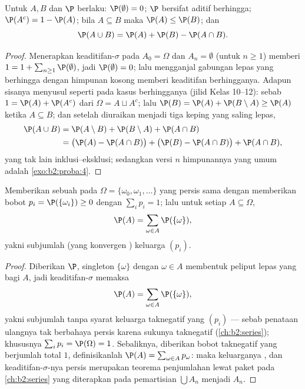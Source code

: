 \begin{proposition}\label{prop:b2:proba:rules}
Untuk  $A, B$ dan  $\P$ berlaku:
$\P(\emptyset) = 0$; $\P$ bersifat aditif berhingga; $\P(A^c) = 1 -
\P(A)$; bila $A \subseteq B$ maka $\P(A) \leq \P(B)$; dan
\[
\P(A \cup B) = \P(A) + \P(B) - \P(A \cap B) .
\]
\end{proposition}

\begin{proof}
Menerapkan keaditifan-$\sigma$ pada $A_0 = \Omega$ dan $A_n = \emptyset$
(untuk $n \geq 1$) memberi $1 = 1 + \sum_{n\geq1}\P(\emptyset)$, jadi
$\P(\emptyset) = 0$; lalu mengganjal gabungan lepas yang berhingga dengan himpunan
kosong memberi keaditifan berhingganya. Adapun sisanya menyusul seperti pada
kasus berhingganya (jilid Kelas 10--12): sebab $1 = \P(A) + \P(A^c)$ dari
$\Omega = A \sqcup A^c$; lalu $\P(B) = \P(A) + \P(B \setminus A)
\geq \P(A)$ ketika $A \subseteq B$; dan setelah diuraikan menjadi tiga
keping yang saling lepas,
\begin{align*}
\P(A \cup B) &= \P(A \setminus B) + \P(B \setminus A) +
\P(A \cap B)\\
&= \bigl(\P(A) - \P(A\cap B)\bigr) + \bigl(\P(B) - \P(A\cap
B)\bigr) + \P(A \cap B),
\end{align*}
yang tak lain inklusi--eksklusi; sedangkan versi $n$ himpunannya yang umum adalah
\cref{exo:b2:proba:4}.
\end{proof}

\begin{proposition}\label{prop:b2:proba:distribution}
Memberikan sebuah  pada $\Omega =
\{\omega_0, \omega_1, \dots\}$ yang  persis sama dengan memberikan bobot
$p_i = \P(\{\omega_i\}) \geq 0$ dengan $\sum_i p_i = 1$; lalu untuk
setiap $A \subseteq \Omega$,
\[
\P(A) = \sum_{\omega \in A} \P(\{\omega\}) ,
\]
yakni subjumlah (yang konvergen ) keluarga $(p_i)$.
\end{proposition}

\begin{proof}
Diberikan $\P$, singleton $\{\omega\}$ dengan $\omega \in A$ membentuk
peliput lepas yang  bagi $A$, jadi keaditifan-$\sigma$ memaksa
\[
\P(A) = \sum_{\omega\in A}\P(\{\omega\}),
\]
yakni subjumlah tanpa syarat keluarga taknegatif yang 
$(p_i)$ --- sebab penataan ulangnya tak berbahaya persis karena
sukunya taknegatif (\cref{ch:b2:series}); khususnya
$\sum_ip_i = \P(\Omega) = 1$.
Sebaliknya, diberikan bobot taknegatif yang berjumlah total $1$, definisikanlah
$\P(A) = \sum_{\omega \in A}p_\omega$: maka keluarganya , dan
keaditifan-$\sigma$-nya persis merupakan teorema penjumlahan lewat paket
pada \cref{ch:b2:series} yang diterapkan pada pemartisian $\bigcup A_n$
menjadi $A_n$.
\end{proof}

